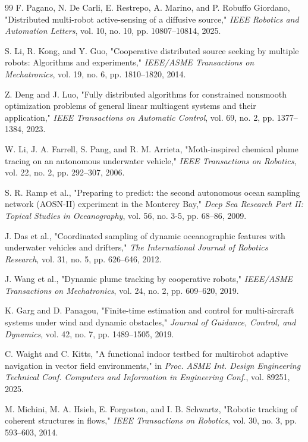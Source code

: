 \documentclass[lettersize,journal]{IEEEtran}
\begin{document}
\begin{thebibliography}{99}
 F. Pagano, N. De Carli, E. Restrepo, A. Marino, and P. Robuffo Giordano, "Distributed multi-robot active-sensing of a diffusive source," \textit{IEEE Robotics and Automation Letters}, vol. 10, no. 10, pp. 10807--10814, 2025.

 S. Li, R. Kong, and Y. Guo, "Cooperative distributed source seeking by multiple robots: Algorithms and experiments," \textit{IEEE/ASME Transactions on Mechatronics}, vol. 19, no. 6, pp. 1810--1820, 2014.

 Z. Deng and J. Luo, "Fully distributed algorithms for constrained nonsmooth optimization problems of general linear multiagent systems and their application," \textit{IEEE Transactions on Automatic Control}, vol. 69, no. 2, pp. 1377--1384, 2023.

 W. Li, J. A. Farrell, S. Pang, and R. M. Arrieta, "Moth-inspired chemical plume tracing on an autonomous underwater vehicle," \textit{IEEE Transactions on Robotics}, vol. 22, no. 2, pp. 292--307, 2006.

 S. R. Ramp et al., "Preparing to predict: the second autonomous ocean sampling network (AOSN-II) experiment in the Monterey Bay," \textit{Deep Sea Research Part II: Topical Studies in Oceanography}, vol. 56, no. 3-5, pp. 68--86, 2009.

 J. Das et al., "Coordinated sampling of dynamic oceanographic features with underwater vehicles and drifters," \textit{The International Journal of Robotics Research}, vol. 31, no. 5, pp. 626--646, 2012.

 J. Wang et al., "Dynamic plume tracking by cooperative robots," \textit{IEEE/ASME Transactions on Mechatronics}, vol. 24, no. 2, pp. 609--620, 2019.

 K. Garg and D. Panagou, "Finite-time estimation and control for multi-aircraft systems under wind and dynamic obstacles," \textit{Journal of Guidance, Control, and Dynamics}, vol. 42, no. 7, pp. 1489--1505, 2019.

 C. Waight and C. Kitts, "A functional indoor testbed for multirobot adaptive navigation in vector field environments," in \textit{Proc. ASME Int. Design Engineering Technical Conf. Computers and Information in Engineering Conf.}, vol. 89251, 2025.

 M. Michini, M. A. Hsieh, E. Forgoston, and I. B. Schwartz, "Robotic tracking of coherent structures in flows," \textit{IEEE Transactions on Robotics}, vol. 30, no. 3, pp. 593--603, 2014.


\end{thebibliography}
\end{document}
